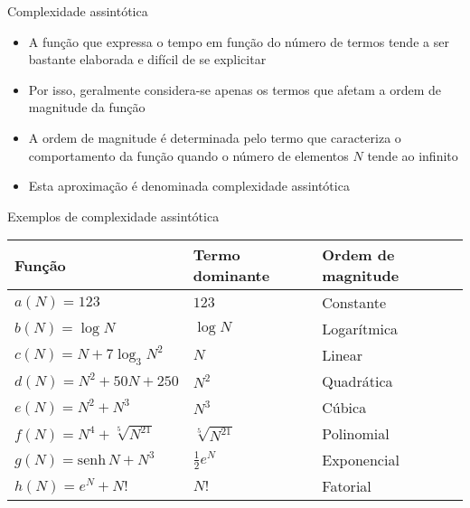 \begin{frame}[fragile]{Complexidade assintótica}

	\begin{itemize}
		\item A função que expressa o tempo em função do número de 
		termos tende a ser bastante elaborada e difícil de se explicitar

        \item Por isso, geralmente considera-se apenas os termos que afetam a 
		ordem de magnitude da função

		\item A ordem de magnitude é determinada pelo termo que caracteriza o comportamento da 
        função quando o número de elementos $N$ tende ao infinito

		\item Esta aproximação é denominada complexidade assintótica
	\end{itemize}

\end{frame}

\begin{frame}[fragile]{Exemplos de complexidade assintótica}

    \begin{table}[!ht]
        \centering
        \begin{tabular}{lll}
        \toprule
        \textbf{Função} & \textbf{Termo dominante} & \textbf{Ordem de magnitude} \\
        \midrule
        $a(N) = 123$ & $123$ & Constante \\
        \rowcolor[gray]{0.9}
        $b(N) = \log N$ & $\log N$ & Logarítmica \\
        $c(N) = N + 7\log_3 N^2$ & $N$ & Linear \\
        \rowcolor[gray]{0.9}
        $d(N)  = N^2 + 50N +  250$ & $N^2$ & Quadrática \\
        $e(N)  = N^2 + N^3$ & $N^3$ & Cúbica \\
        \rowcolor[gray]{0.9}
        $f(N) = N^4 + \sqrt[5]{N^{21}}$ & $\sqrt[5]{N^{21}}$ & Polinomial \\
        $g(N) = \mbox{senh}\, N + N^3$ & $ \frac{1}{2}e^N$ & Exponencial \\
        \rowcolor[gray]{0.9}
        $h(N) = e^N + N!$ & $ N!$ & Fatorial \\
        \bottomrule
        \end{tabular}
    \end{table}
	
\end{frame}

